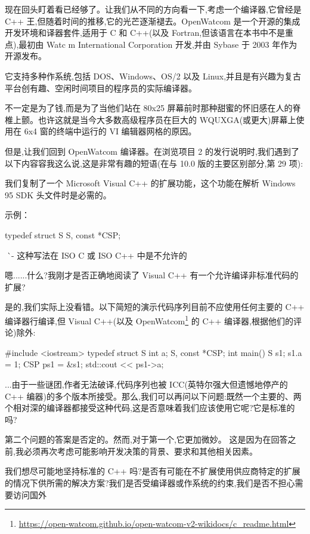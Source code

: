 现在回头盯着看已经够了。让我们从不同的方向看一下,考虑一个编译器,它曾经是 C++ 王,但随着时间的推移,它的光芒逐渐褪去。OpenWatcom 是一个开源的集成开发环境和译器套件,适用于 C 和 C++(以及 Fortran,但该语言在本书中不是重点),最初由 Watc m International Corporation 开发,并由 Sybase 于 2003 年作为开源发布。

它支持多种作系统,包括 DOS、Windows、OS/2 以及 Linux,并且是有兴趣为复古平台创有趣、空闲时间项目的程序员的实际编译器。

不一定是为了钱,而是为了当他们站在 80x25 屏幕前时那种甜蜜的怀旧感在人的脊椎上颤。也许这就是当今大多数高级程序员在巨大的 WQUXGA(或更大)屏幕上使用在 6x4 窗的终端中运行的 VI 编辑器网格的原因。

但是,让我们回到 OpenWatcom 编译器。在浏览项目 2 的发行说明时,我们遇到了以下内容容我这么说,这是非常有趣的短语(在与 10.0 版的主要区别部分,第 29 项):

\begin{shell}
我们复制了一个 Microsoft Visual C++ 的扩展功能，这个功能在解析 Windows 95 SDK 头文件时是必需的。

示例：

typedef struct S {
} S, const *CSP;

^^^^^ - 这种写法在 ISO C 或 ISO C++ 中是不允许的
\end{shell}

嗯......什么?我刚才是否正确地阅读了 Visual C++ 有一个允许编译非标准代码的扩展? 

是的,我们实际上没看错。以下简短的演示代码序列目前不应使用任何主要的 C++ 编译器行编译,但 Visual C++(以及 OpenWatcom\footnote{\url{https://open-watcom.github.io/open-watcom-v2-wikidocs/c_readme.html}} 的 C++ 编译器,根据他们的评论)除外:

\begin{cpp}
#include <iostream>
typedef struct S {
  int a;
} S, const *CSP;
int main() {
  S s1; s1.a = 1;
  CSP ps1 = &s1;
  std::cout << ps1->a;
}
\end{cpp}

...由于一些谜团,作者无法破译,代码序列也被 ICC(英特尔强大但遗憾地停产的 C++ 编器)的多个版本所接受。那么,我们可以再问以下问题:既然一个主要的、两个相对深的编译器都接受这种代码,这是否意味着我们应该使用它呢?它是标准的吗? 

第二个问题的答案是否定的。然而,对于第一个,它更加微妙。 这是因为在回答之前,我必须再次考虑可能影响开发决策的背景、要求和其他相关因素。

我们想尽可能地坚持标准的 C++ 吗?是否有可能在不扩展使用供应商特定的扩展的情况下供所需的解决方案?我们是否受编译器或作系统的约束,我们是否不担心需要访问国外

